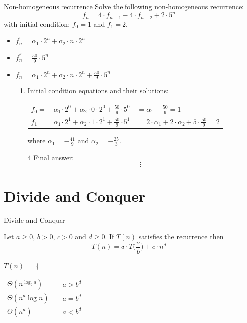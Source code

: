 \documentclass{beamer}
\begin{document}
\begin{frame}{Non-homogeneous recurrence}
    Solve the following non-homogeneous recurrence:
    \begin{equation}\tag{1}
        f_n = 4 \cdot f_{n-1} - 4 \cdot f_{n-2} + 2 \cdot 5^n
    \end{equation}
    with initial condition: $f_0 = 1$ and $f_1 = 2$.
    
    \begin{itemize}
        \item $ f_n^{'} = \alpha_1 \cdot 2^n + \alpha_2 \cdot n \cdot 2^n $
        \item $ f_n^{''} = \frac{50}{9} \cdot 5^n $
        \item $ f_n = \alpha_1 \cdot 2^n + \alpha_2 \cdot n \cdot 2^n + \frac{50}{9} \cdot 5^n $
        \begin{enumerate}[3]
            \item Initial condition equations and their solutions:
                \begin{tabular}{l l l}
                    $f_0 = $ & $\alpha_1 \cdot 2^0 + \alpha_2 \cdot 0 \cdot 2^0 + \frac{50}{9} \cdot 5^0$ & $= \alpha_1 + \frac{50}{9} = 1$ \\
                    $f_1 = $ & $\alpha_1 \cdot 2^1 + \alpha_2 \cdot 1 \cdot 2^1 + \frac{50}{9} \cdot 5^1$ & $= 2 \cdot \alpha_1 + 2 \cdot \alpha_2 + 5 \cdot \frac{50}{9} = 2 $ \\
                \end{tabular}
                where $\alpha_1 = -\frac{41}{9} $ and $ \alpha_2 = -\frac{25}{3}$.
            \item[4] Final answer:
                $$ \vdots $$
        \end{enumerate}
    \end{itemize}
\end{frame}

\section{Divide and Conquer}

\begin{frame}{Divide and Conquer}
    \centering
    \begin{theorem}
        Let $a \geq 0$, $b > 0$, $c > 0$ and $d \geq 0$.  If $T(n)$ satisfies the recurrence then
        $$ T(n) = a \cdot T \Big(\frac{n}{b}\Big) + c \cdot n^d $$
    \end{theorem}
    
    $T(n) =$ 
    \left\{
    \begin{tabular}{l r r}
        $\Theta (n^{\log_b a})$ & \hspace{1cm} & $a > b^d$ \\
        $\Theta (n^d \log n)$   & \hspace{1cm} & $a = b^d$ \\
        $\Theta (n^d)$          & \hspace{1cm} & $a < b^d$ 
    \end{tabular}
\end{frame}
\end{document}
